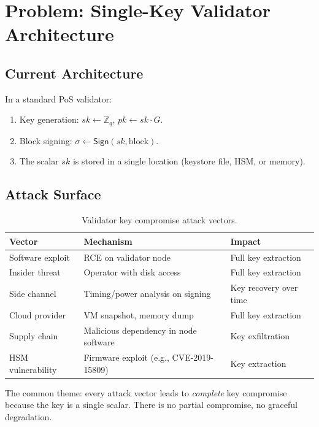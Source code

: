 \section{Problem: Single-Key Validator Architecture}

\label{sec:problem}

\subsection{Current Architecture}

In a standard PoS validator:

\begin{enumerate}[leftmargin=2em]
  \item Key generation: $sk \leftarrow \mathbb{Z}_q$, $pk \leftarrow sk \cdot G$.
  \item Block signing: $\sigma \leftarrow \textsf{Sign}(sk, \text{block})$.
  \item The scalar $sk$ is stored in a single location (keystore file, HSM, or memory).
\end{enumerate}

\subsection{Attack Surface}

\begin{table}[ht]
\centering
\caption{Validator key compromise attack vectors.}
\label{tab:attack-vectors}
\begin{tabular}{lll}
\toprule
\textbf{Vector} & \textbf{Mechanism} & \textbf{Impact} \\
\midrule
Software exploit & RCE on validator node & Full key extraction \\
Insider threat & Operator with disk access & Full key extraction \\
Side channel & Timing/power analysis on signing & Key recovery over time \\
Cloud provider & VM snapshot, memory dump & Full key extraction \\
Supply chain & Malicious dependency in node software & Key exfiltration \\
HSM vulnerability & Firmware exploit (e.g., CVE-2019-15809) & Key extraction \\
\bottomrule
\end{tabular}
\end{table}

The common theme: every attack vector leads to \emph{complete} key compromise because
the key is a single scalar. There is no partial compromise, no graceful degradation.

